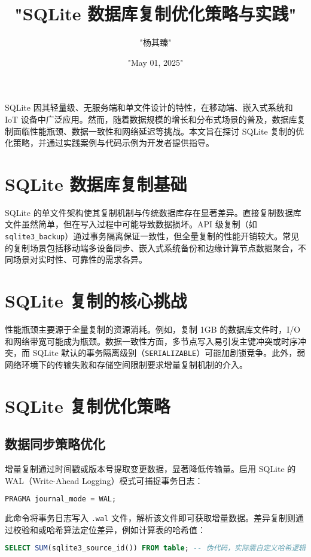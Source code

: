 \title{"SQLite 数据库复制优化策略与实践"}
\author{"杨其臻"}
\date{"May 01, 2025"}
\maketitle
SQLite 因其轻量级、无服务端和单文件设计的特性，在移动端、嵌入式系统和 IoT 设备中广泛应用。然而，随着数据规模的增长和分布式场景的普及，数据库复制面临性能瓶颈、数据一致性和网络延迟等挑战。本文旨在探讨 SQLite 复制的优化策略，并通过实践案例与代码示例为开发者提供指导。\par
\chapter{SQLite 数据库复制基础}
SQLite 的单文件架构使其复制机制与传统数据库存在显著差异。直接复制数据库文件虽然简单，但在写入过程中可能导致数据损坏。API 级复制（如 \verb!sqlite3_backup!）通过事务隔离保证一致性，但全量复制的性能开销较大。常见的复制场景包括移动端多设备同步、嵌入式系统备份和边缘计算节点数据聚合，不同场景对实时性、可靠性的需求各异。\par
\chapter{SQLite 复制的核心挑战}
性能瓶颈主要源于全量复制的资源消耗。例如，复制 1GB 的数据库文件时，I/O 和网络带宽可能成为瓶颈。数据一致性方面，多节点写入易引发主键冲突或时序冲突，而 SQLite 默认的事务隔离级别（\verb!SERIALIZABLE!）可能加剧锁竞争。此外，弱网络环境下的传输失败和存储空间限制要求增量复制机制的介入。\par
\chapter{SQLite 复制优化策略}
\section{数据同步策略优化}
增量复制通过时间戳或版本号提取变更数据，显著降低传输量。启用 SQLite 的 WAL（Write-Ahead Logging）模式可捕捉事务日志：\par
\begin{lstlisting}[language=sql]
PRAGMA journal_mode = WAL;
\end{lstlisting}
此命令将事务日志写入 \verb!.wal! 文件，解析该文件即可获取增量数据。差异复制则通过校验和或哈希算法定位差异，例如计算表的哈希值：\par
\begin{lstlisting}[language=sql]
SELECT SUM(sqlite3_source_id()) FROM table; -- 伪代码，实际需自定义哈希逻辑
\end{lstlisting}
